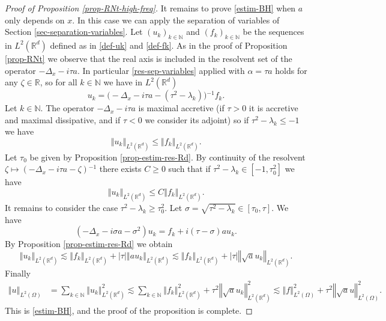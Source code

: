 \documentclass[10pt, a4paper,reqno]{amsart}
\theoremstyle{plain}
\theoremstyle{definition}
\theoremstyle{remark}
\begin{document}
\begin{proof} [Proof of Proposition \ref{prop-RNt-high-freq}]
{\noindent {\bf $\bullet$}\quad } It remains to prove \eqref{estim-BH} when $a$ only depends on $x$. In this case we can apply the separation of variables of Section \ref{sec-separation-variables}. 
Let ${\left({u}_{k}\right)_{k \in{\mathbb{N}}}}$ and ${\left({f}_{k}\right)_{k \in{\mathbb{N}}}}$ be the sequences in $L^2({\mathbb{R}}^d)$ defined as in \eqref{def-uk} and \eqref{def-fk}. 
As in the proof of Proposition \ref{prop-RNt} we observe that the real axis is included in the resolvent set of the operator $-{{\Delta}_x} - i{\tau} a$. In particular \eqref{res-sep-variables} applied with ${\alpha} = {\tau} a$ holds for any ${\zeta} \in {\mathbb{R}}$, so for all $k \in {\mathbb{N}}$ we have in $L^2({\mathbb{R}}^d)$
\[
u_k = \big( -{{\Delta}_x}  -i{\tau} a - ({\tau}^2-{\lambda}_k) \big){^{-1}} f_k.
\]
Let $k\in{\mathbb{N}}$. The operator $-{{\Delta}_x} -i{\tau} a$ is maximal accretive (if ${\tau} > 0$ it is accretive and maximal dissipative, and if ${\tau} < 0$ we consider its adjoint) so if ${\tau}^2 - {\lambda}_k {\leqslant} - 1$ we have
\[
{\left\Vert {u_k}\right\Vert}_{L^2({\mathbb{R}}^d)} {\leqslant} {\left\Vert {f_k}\right\Vert}_{L^2({\mathbb{R}}^d)}.
\]
Let ${\tau}_0$ be given by Proposition \ref{prop-estim-res-Rd}. By continuity of the resolvent ${\zeta} \mapsto (-{{\Delta}_x} -i {\tau} a - {\zeta}){^{-1}}$ there exists $C {\geqslant} 0$ such that if ${\tau}^2 - {\lambda}_k \in [-1,{\tau}_0^2]$ we have 
\[
{\left\Vert {u_k}\right\Vert}_{L^2({\mathbb{R}}^d)} {\leqslant} C {\left\Vert {f_k}\right\Vert}_{L^2({\mathbb{R}}^d)}.
\]
It remains to consider the case ${\tau}^2 - {\lambda}_k {\geqslant} {\tau}_0^2$. Let ${\sigma} = \sqrt {{\tau}^2 - {\lambda}_k} \in [{\tau}_0,{\tau}]$. We have 
\[
(-{{\Delta}_x} - i{\sigma} a - {\sigma}^2) u_k = f_k + i ({\tau}-{\sigma})a u_k.
\]
By Proposition \ref{prop-estim-res-Rd} we obtain 
\[
{\left\Vert {u_k}\right\Vert}_{L^2({\mathbb{R}}^d)} \lesssim {\left\Vert {f_k}\right\Vert}_{L^2({\mathbb{R}}^d)} + {\left\vert {\tau}\right\vert} {\left\Vert {au_k}\right\Vert}_{L^2({\mathbb{R}}^d)} \lesssim {\left\Vert {f_k}\right\Vert}_{L^2({\mathbb{R}}^d)} + {\left\vert {\tau}\right\vert} {\left\Vert {\sqrt a u_k}\right\Vert}_{L^2({\mathbb{R}}^d)}.
\]
Finally 
\begin{align*}
{\left\Vert {u}\right\Vert}_{L^2({\Omega})}
& = \sum_{k\in{\mathbb{N}}} {\left\Vert {u_k}\right\Vert}_{L^2({\mathbb{R}}^d)}^2 \lesssim \sum_{k\in{\mathbb{N}}} {\left\Vert {f_k}\right\Vert}_{L^2({\mathbb{R}}^d)}^2 + {\tau}^2 {\left\Vert {\sqrt a u_k}\right\Vert}_{L^2({\mathbb{R}}^d)}^2 \lesssim {\left\Vert {f}\right\Vert}_{L^2({\Omega})}^2 + {\tau}^2 {\left\Vert {\sqrt a u}\right\Vert}_{L^2({\Omega})}^2.
\end{align*}
This is \eqref{estim-BH}, and the proof of the proposition is complete. 
\end{proof}
\end{document}
